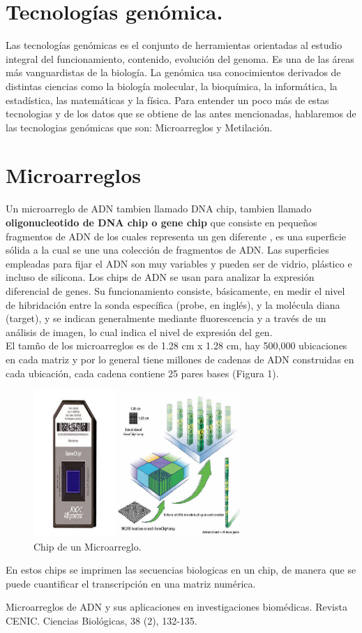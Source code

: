 \documentclass[12pt,letterpaper]{article}
\begin{document}
\section{Tecnologías genómica.}
Las tecnologías genómicas es el conjunto de herramientas orientadas al estudio integral del funcionamiento, contenido,  evolución del genoma. Es una de las áreas más vanguardistas de la biología. La genómica usa conocimientos derivados de distintas ciencias como la biología molecular, la bioquímica, la informática, la estadística, las matemáticas y la física.
Para entender un poco más de estas tecnologias y de los datos que se obtiene de las antes mencionadas, hablaremos de las tecnologias genómicas que son: Microarreglos y Metilación.
\section{Microarreglos}
Un microarreglo de ADN tambien llamado DNA chip, tambien llamado \textbf{oligonucleotido de DNA chip o gene chip} que consiste en pequeños fragmentos de ADN de los cuales representa un gen diferente \cite{VallinPlous2007}, es una superficie sólida a la cual se une una colección de fragmentos de ADN. Las superficies empleadas para fijar el ADN son muy variables y pueden ser de vidrio, plástico e incluso de silicona. Los chips de ADN se usan para analizar la expresión diferencial de genes.  Su funcionamiento consiste, básicamente, en medir el nivel de hibridación entre la sonda específica (probe, en inglés), y la molécula diana (target), y se indican generalmente mediante fluorescencia y a través de un análisis de imagen, lo cual indica el nivel de expresión del gen.	\\
El tamño de los microarreglos es de 1.28 cm x 1.28 cm, hay 500,000 ubicaciones en cada matriz y por lo general tiene millones de cadenas de ADN construidas en cada ubicación, cada cadena contiene 25 pares bases (Figura 1).
\begin{figure}[H]
\begin{center}
\includegraphics[width=0.7\textwidth]{Genechip.png}
\end{center}
\caption{Chip de un Microarreglo.}
\end{figure}
En estos chips se imprimen las secuencias biologicas en un chip, de manera que se puede cuantificar el transcripción en una matriz numérica.	

\begin{thebibliography}{XXX0000}
   Microarreglos de ADN y sus aplicaciones en investigaciones biomédicas. Revista CENIC. Ciencias Biológicas, 38 (2), 132-135. 
\end{thebibliography} 	
\end{document}
